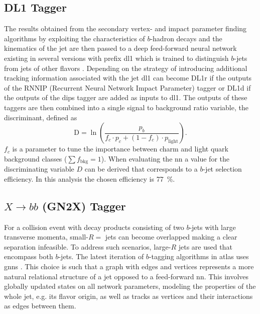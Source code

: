 \subsection{DL1 Tagger}\label{sec:dl1}
The results obtained from the secondary vertex- and impact parameter finding algorithms by exploiting the characteristics of $b$-hadron decays and the kinematics of the jet are then passed to a deep feed-forward neural network existing in several versions with prefix \ac{dl1} which is trained to distinguish $b$-jets from jets of other flavors \citep{atlas2022atlas}.
Depending on the strategy of introducing additional tracking information associated with the jet \ac{dl1} can become DL1r if the outputs of the RNNIP (Recurrent Neural Network Impact Parameter) \citep{Gilles:2806947} tagger or DL1d if the outputs of the \ac{dips} \citep{ATL-PHYS-PUB-2020-014} tagger are added as inputs to \ac{dl1}. The outputs of these taggers are then combined into a single signal to background ratio variable, the discriminant, defined as
\begin{equation}
  \mathrm{D}=\ln\left(\frac{p_b}{f_c \cdot p_c + (1-f_c)\cdot p_\mathrm{light} }\right).
\end{equation}
$f_c$ is a parameter to tune the importance between charm and light quark background classes ($\sum f_\mathrm{bkg} =1$). When evaluating the \ac{nn} a value for the discriminating variable $D$ can be derived that corresponds to a $b$-jet selection efficiency. In this analysis the chosen efficiency is \qty[]{77}{\percent}.

\subsection{$X\rightarrow bb$ (GN2X) Tagger}\label{sec:gn2x}
For a collision event with decay products consisting of two $b$-jets with large transverse momenta, small-$R=$ jets can become overlapped making a clear separation infeasible. To address such scenarios, large-$R$ jets are used that encompass both $b$-jets. The latest iteration of $b$-tagging algorithms in \ac{atlas} uses \acp{gnn} \citep{shlomi2020graph, ATL-PHYS-PUB-2022-027}. This choice is such that a graph with edges and vertices represents a more natural relational structure of a jet opposed to a feed-forward \ac{nn}. This involves globally updated states on all network parameters, modeling the properties of the whole jet, e.g. its flavor origin, as well as tracks as vertices and their interactions as edges between them.

